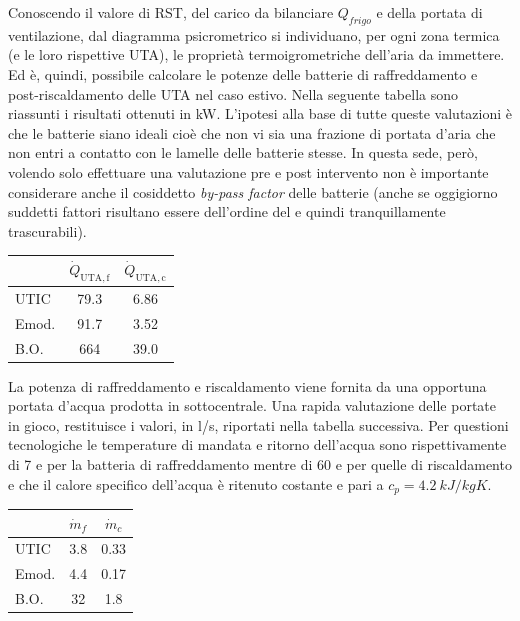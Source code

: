 Conoscendo il valore di RST, del carico da bilanciare $Q_{frigo}$ e della portata di ventilazione, dal diagramma psicrometrico si individuano, per ogni zona termica (e le loro rispettive UTA), le proprietà termoigrometriche dell'aria da immettere. Ed è, quindi, possibile calcolare le potenze delle batterie di raffreddamento e post-riscaldamento delle UTA nel caso estivo. Nella seguente tabella sono riassunti i risultati ottenuti in \si{kW}. L'ipotesi alla base di tutte queste valutazioni è che le batterie siano ideali cioè che non vi sia una frazione di portata d'aria che non entri a contatto con le lamelle delle batterie stesse. In questa sede, però, volendo solo effettuare una valutazione pre e post intervento non è importante considerare anche il cosiddetto \emph{by-pass factor} delle batterie (anche se oggigiorno suddetti fattori risultano essere dell'ordine del  e quindi tranquillamente trascurabili).
\begin{center}
	\begin{tabular}{lcc}
		&	$\dot{Q}_{\mathrm{UTA,f}}$		&	$\dot{Q}_{\mathrm{UTA,c}}$\\
		\midrule
		UTIC	&	\num{79.3}			&	\num{6.86}\\
		Emod.	&	\num{91.7}			&	\num{3.52}\\
		B.O.	&	\num{664}			&	\num{39.0}\\
	\end{tabular}
\end{center}
La potenza di raffreddamento e riscaldamento viene fornita da una opportuna portata d'acqua prodotta in sottocentrale. Una rapida valutazione delle portate in gioco, restituisce i valori, in \si{l/s}, riportati nella tabella successiva. Per questioni tecnologiche le temperature di mandata e ritorno dell'acqua sono rispettivamente di \num{7} e  per la batteria di raffreddamento mentre di \num{60} e  per quelle di riscaldamento e che il calore specifico dell'acqua è ritenuto costante e pari a $c_p=\SI{4.2}{kJ/kgK}$.
\begin{center}
	\begin{tabular}{lcc}
			&	$\dot{m}_f$	&	$\dot{m}_c$\\
			\midrule
			UTIC	&	\num{3.8}	&	\num{0.33}\\
			Emod.	&	\num{4.4}	&	\num{0.17}\\
			B.O.	&	\num{32}		&	\num{1.8}\\
	\end{tabular}
\end{center}

